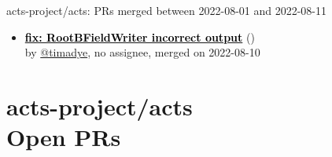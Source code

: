 \begin{frame}[allowframebreaks]{ acts-project/acts: PRs merged 
between 2022-08-01 and 2022-08-11
}
\begin{itemize}
    \item\prmerged\textbf{\href{https://github.com/acts-project/acts/pull/1381}{\textcolor{black}{fix: RootBFieldWriter incorrect output}}}
    (\href{https://github.com/acts-project/acts/pull/1381}{}) \\
    by \href{https://github.com/timadye}{@timadye}, {}no assignee, merged on 2022-08-10

  \end{itemize}

\end{frame}



\section{ acts-project/acts \\ Open PRs}

